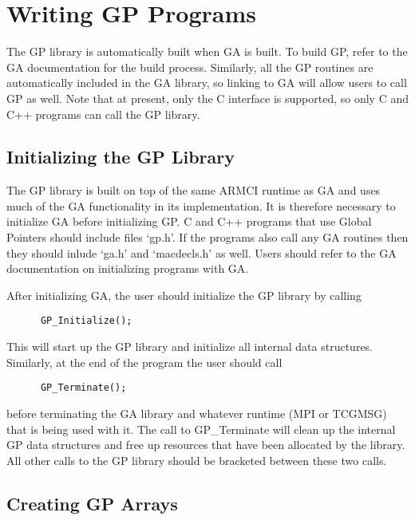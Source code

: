\chapter{Writing GP Programs}

The GP library is automatically built when GA is built. To build GP, refer to
the GA documentation for the build process. Similarly, all the GP routines are
automatically included in the GA library, so linking to GA will allow users to
call GP as well. Note that at present, only the C interface is supported, so
only C and C++ programs can call the GP library.

\section{Initializing the GP Library}

The GP library is built on top of the same ARMCI runtime as GA and uses much of
the GA functionality in its implementation. It is therefore necessary to
initialize GA before initializing GP. C and C++ programs that use Global Pointers should
include files `gp.h'. If the programs also call any GA routines then they
should inlude `ga.h' and `macdecls.h' as well. Users should refer
to the GA documentation on initializing programs with GA.

After initializing GA, the user should initialize the GP library by
calling

\begin{verbatim}
      GP_Initialize();
\end{verbatim}

\noindent
This will start up the GP library and initialize all internal data structures.
Similarly, at the end of the program the user should call

\begin{verbatim}
      GP_Terminate();
\end{verbatim}

\noindent
before terminating the GA library and whatever runtime (MPI or TCGMSG) that is
being used with it. The call to GP\_Terminate will clean up the internal GP data
structures and free up resources that have been allocated by the library. All
other calls to the GP library should be bracketed between these two calls.

\section{Creating GP Arrays}


